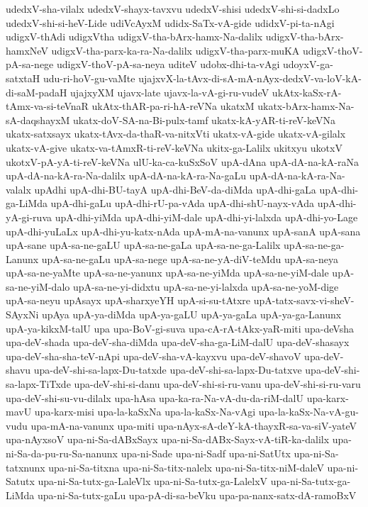 {udedxV-sha-vilalx
udedxV-shayx-tavxvu
udedxV-shisi
udedxV-shi-si-dadxLo
udedxV-shi-si-heV-Lide
udiVcAyxM
udidx-SaTx-vA-gide
udidxV-pi-ta-nAgi
udigxV-thAdi
udigxVtha
udigxV-tha-bArx-hamx-Na-dalilx
udigxV-tha-bArx-hamxNeV
udigxV-tha-parx-ka-ra-Na-dalilx
udigxV-tha-parx-muKA
udigxV-thoV-pA-sa-nege
udigxV-thoV-pA-sa-neya
uditeV
udobx-dhi-ta-vAgi
udoyxV-ga-satxtaH
udu-ri-hoV-gu-vaMte
ujajxvX-la-tAvx-di-sA-mA-nAyx-dedxV-va-loV-kA-di-saM-padaH
ujajxyXM
ujavx-late
ujavx-la-vA-gi-ru-vudeV
ukAtx-kaSx-rA-tAmx-va-si-teVnaR
ukAtx-thAR-pa-ri-hA-reVNa
ukatxM
ukatx-bArx-hamx-Na-sA-daqshayxM
ukatx-doV-SA-na-Bi-pulx-tamf
ukatx-kA-yAR-ti-reV-keVNa
ukatx-satxsayx
ukatx-tAvx-da-thaR-va-nitxVti
ukatx-vA-gide
ukatx-vA-gilalx
ukatx-vA-give
ukatx-va-tAmxR-ti-reV-keVNa
ukitx-ga-Lalilx
ukitxyu
ukotxV
ukotxV-pA-yA-ti-reV-keVNa
ulU-ka-ca-kuSxSoV
upA-dAna
upA-dA-na-kA-raNa
upA-dA-na-kA-ra-Na-dalilx
upA-dA-na-kA-ra-Na-gaLu
upA-dA-na-kA-ra-Na-valalx
upAdhi
upA-dhi-BU-tayA
upA-dhi-BeV-da-diMda
upA-dhi-gaLa
upA-dhi-ga-LiMda
upA-dhi-gaLu
upA-dhi-rU-pa-vAda
upA-dhi-shU-nayx-vAda
upA-dhi-yA-gi-ruva
upA-dhi-yiMda
upA-dhi-yiM-dale
upA-dhi-yi-lalxda
upA-dhi-yo-Lage
upA-dhi-yuLaLx
upA-dhi-yu-katx-nAda
upA-mA-na-vanunx
upA-sanA
upA-sana
upA-sane
upA-sa-ne-gaLU
upA-sa-ne-gaLa
upA-sa-ne-ga-Lalilx
upA-sa-ne-ga-Lanunx
upA-sa-ne-gaLu
upA-sa-nege
upA-sa-ne-yA-diV-teMdu
upA-sa-neya
upA-sa-ne-yaMte
upA-sa-ne-yanunx
upA-sa-ne-yiMda
upA-sa-ne-yiM-dale
upA-sa-ne-yiM-dalo
upA-sa-ne-yi-didxtu
upA-sa-ne-yi-lalxda
upA-sa-ne-yoM-dige
upA-sa-neyu
upAsayx
upA-sharxyeYH
upA-si-su-tAtxre
upA-tatx-savx-vi-sheV-SAyxNi
upAya
upA-ya-diMda
upA-ya-gaLU
upA-ya-gaLa
upA-ya-ga-Lanunx
upA-ya-kikxM-talU
upa
upa-BoV-gi-suva
upa-cA-rA-tAkx-yaR-miti
upa-deVsha
upa-deV-shada
upa-deV-sha-diMda
upa-deV-sha-ga-LiM-dalU
upa-deV-shasayx
upa-deV-sha-sha-teV-nApi
upa-deV-sha-vA-kayxvu
upa-deV-shavoV
upa-deV-shavu
upa-deV-shi-sa-lapx-Du-tatxde
upa-deV-shi-sa-lapx-Du-tatxve
upa-deV-shi-sa-lapx-TiTxde
upa-deV-shi-si-danu
upa-deV-shi-si-ru-vanu
upa-deV-shi-si-ru-varu
upa-deV-shi-su-vu-dilalx
upa-hAsa
upa-ka-ra-Na-vA-du-da-riM-dalU
upa-karx-mavU
upa-karx-misi
upa-la-kaSxNa
upa-la-kaSx-Na-vAgi
upa-la-kaSx-Na-vA-gu-vudu
upa-mA-na-vanunx
upa-miti
upa-nAyx-sA-deY-kA-thayxR-sa-va-siV-yateV
upa-nAyxsoV
upa-ni-Sa-dABxSayx
upa-ni-Sa-dABx-Sayx-vA-tiR-ka-dalilx
upa-ni-Sa-da-pu-ru-Sa-nanunx
upa-ni-Sade
upa-ni-Sadf
upa-ni-SatUtx
upa-ni-Sa-tatxnunx
upa-ni-Sa-titxna
upa-ni-Sa-titx-nalelx
upa-ni-Sa-titx-niM-daleV
upa-ni-Satutx
upa-ni-Sa-tutx-ga-LaleVlx
upa-ni-Sa-tutx-ga-LalelxV
upa-ni-Sa-tutx-ga-LiMda
upa-ni-Sa-tutx-gaLu
upa-pA-di-sa-beVku
upa-pa-nanx-satx-dA-ramoBxV
}
